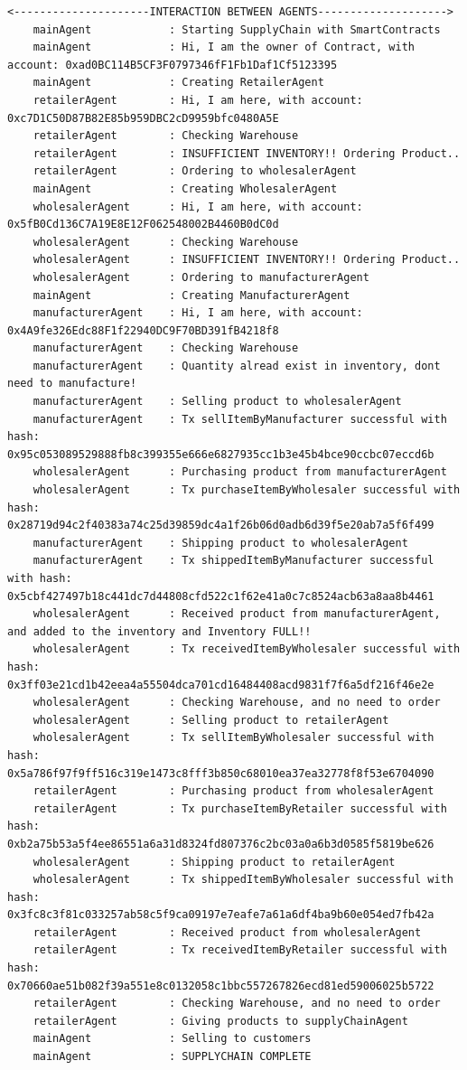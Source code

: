 \begin{itemize}
\begin{lstlisting}[numbers=none, basicstyle=\ttfamily\tiny]
    <---------------------INTERACTION BETWEEN AGENTS-------------------->
    mainAgent            : Starting SupplyChain with SmartContracts
    mainAgent            : Hi, I am the owner of Contract, with account: 0xad0BC114B5CF3F0797346fF1Fb1Daf1Cf5123395
    mainAgent            : Creating RetailerAgent
    retailerAgent        : Hi, I am here, with account: 0xc7D1C50D87B82E85b959DBC2cD9959bfc0480A5E
    retailerAgent        : Checking Warehouse
    retailerAgent        : INSUFFICIENT INVENTORY!! Ordering Product..
    retailerAgent        : Ordering to wholesalerAgent
    mainAgent            : Creating WholesalerAgent
    wholesalerAgent      : Hi, I am here, with account: 0x5fB0Cd136C7A19E8E12F062548002B4460B0dC0d
    wholesalerAgent      : Checking Warehouse
    wholesalerAgent      : INSUFFICIENT INVENTORY!! Ordering Product..
    wholesalerAgent      : Ordering to manufacturerAgent
    mainAgent            : Creating ManufacturerAgent
    manufacturerAgent    : Hi, I am here, with account: 0x4A9fe326Edc88F1f22940DC9F70BD391fB4218f8
    manufacturerAgent    : Checking Warehouse
    manufacturerAgent    : Quantity alread exist in inventory, dont need to manufacture!
    manufacturerAgent    : Selling product to wholesalerAgent
    manufacturerAgent    : Tx sellItemByManufacturer successful with hash: 0x95c053089529888fb8c399355e666e6827935cc1b3e45b4bce90ccbc07eccd6b
    wholesalerAgent      : Purchasing product from manufacturerAgent
    wholesalerAgent      : Tx purchaseItemByWholesaler successful with hash: 0x28719d94c2f40383a74c25d39859dc4a1f26b06d0adb6d39f5e20ab7a5f6f499
    manufacturerAgent    : Shipping product to wholesalerAgent
    manufacturerAgent    : Tx shippedItemByManufacturer successful with hash: 0x5cbf427497b18c441dc7d44808cfd522c1f62e41a0c7c8524acb63a8aa8b4461
    wholesalerAgent      : Received product from manufacturerAgent, and added to the inventory and Inventory FULL!!
    wholesalerAgent      : Tx receivedItemByWholesaler successful with hash: 0x3ff03e21cd1b42eea4a55504dca701cd16484408acd9831f7f6a5df216f46e2e
    wholesalerAgent      : Checking Warehouse, and no need to order
    wholesalerAgent      : Selling product to retailerAgent
    wholesalerAgent      : Tx sellItemByWholesaler successful with hash: 0x5a786f97f9ff516c319e1473c8fff3b850c68010ea37ea32778f8f53e6704090
    retailerAgent        : Purchasing product from wholesalerAgent
    retailerAgent        : Tx purchaseItemByRetailer successful with hash: 0xb2a75b53a5f4ee86551a6a31d8324fd807376c2bc03a0a6b3d0585f5819be626
    wholesalerAgent      : Shipping product to retailerAgent
    wholesalerAgent      : Tx shippedItemByWholesaler successful with hash: 0x3fc8c3f81c033257ab58c5f9ca09197e7eafe7a61a6df4ba9b60e054ed7fb42a
    retailerAgent        : Received product from wholesalerAgent
    retailerAgent        : Tx receivedItemByRetailer successful with hash: 0x70660ae51b082f39a551e8c0132058c1bbc557267826ecd81ed59006025b5722
    retailerAgent        : Checking Warehouse, and no need to order
    retailerAgent        : Giving products to supplyChainAgent
    mainAgent            : Selling to customers
    mainAgent            : SUPPLYCHAIN COMPLETE
    \end{lstlisting}
    

\end{itemize}
